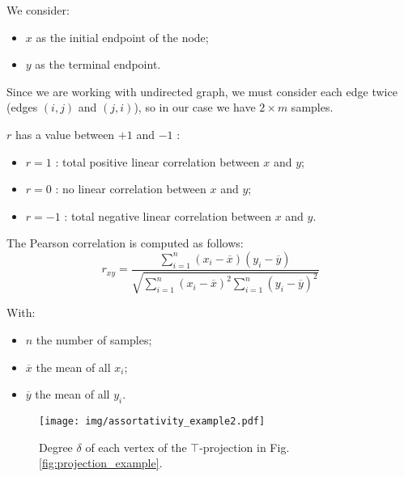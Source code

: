 \documentclass[table]{report}
\begin{document}
We consider:

\begin{itemize}[noitemsep]
    \item $x$ as the initial endpoint of the node;
    \item $y$ as the terminal endpoint.
\end{itemize}


Since we are working with undirected graph, we must consider each edge twice (edges $(i,j)$ and $(j,i)$), so in our case we have 
$2 \times m $ samples.

$r$ has a value between $+1$ and $-1$ : 
\begin{itemize}[noitemsep]
	\item $r=1$  : total positive linear correlation between $x$ and $y$;
	\item $r=0$  : no linear correlation between $x$ and $y$;
	\item $r=-1$ : total negative linear correlation between $x$ and $y$.
\end{itemize}

\noindent
The Pearson correlation is computed as follows:
$$\newcommand \xdiff    {(x_{i}-\overline {x})}
\newcommand   \ydiff    {(y_{i}-\overline {y})}
\newcommand   \sumassort{\sum_{i=1}^{n}}
r_{xy} = \dfrac{\sumassort \xdiff \ydiff } {\sqrt{\sumassort \xdiff^{2} \sumassort \ydiff^{2}}}$$

\noindent
With:
\begin{itemize}[noitemsep]

\item $n$ the number of samples;
\item $\overline{x}$ the mean of all $x_{i}$;
\item $\overline{y}$ the mean of all $y_{i}$.
\end{itemize}


\begin{figure}[h]%
\centering
\texttt{[image: img/assortativity\_example2.pdf]}
\caption{Degree $\delta$ of each vertex of the $\top$-projection in Fig.\ref{fig:projection_example}. }

\label{fig:assortativity_example2}
\end{figure}
\FloatBarrier
\end{document}
